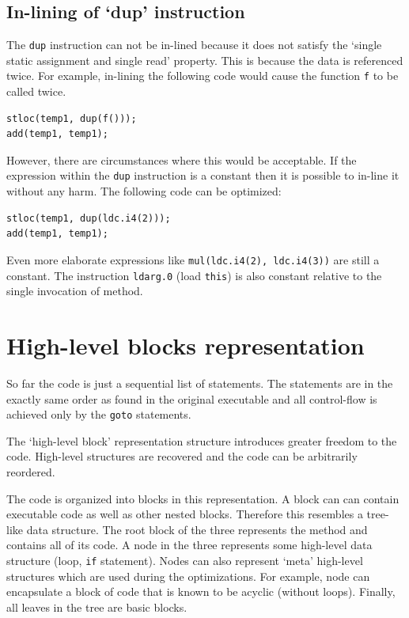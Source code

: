 \documentclass[12pt,twoside,notitlepage]{report}
\begin{document}
\subsection{In-lining of `dup' instruction}

The \verb|dup| instruction can not be in-lined because
it does not satisfy the `single static assignment and single read'
property.  This is because the data is referenced twice.
For example, in-lining the following code would cause 
the function \verb|f| to be called twice.
\begin{verbatim}
stloc(temp1, dup(f()));
add(temp1, temp1);
\end{verbatim}
However, there are circumstances where this would be acceptable.
If the expression within the \verb|dup| instruction is a 
constant then it is possible to in-line it without any harm.
The following code can be optimized:
\begin{verbatim}
stloc(temp1, dup(ldc.i4(2)));
add(temp1, temp1);
\end{verbatim}
Even more elaborate expressions like 
\verb|mul(ldc.i4(2), ldc.i4(3))| are still a constant.
The instruction \verb|ldarg.0| (load \verb|this|) is also
constant relative to the single invocation of method.



\section{High-level blocks representation}
  \label{High-level blocks representation}

So far the code is just a sequential list of statements.
The statements are in the exactly same order as found in the 
original executable and all control-flow is achieved 
only by the \verb|goto| statements.

The `high-level block' representation structure introduces
greater freedom to the code.  High-level structures are recovered 
and the code can be arbitrarily reordered.

The code is organized into blocks in this representation. 
A block can can contain executable code as well as other nested blocks.
Therefore this resembles a tree-like data structure.
The root block of the three represents the method and contains
all of its code.
A node in the three represents some high-level data structure
(loop, \verb|if| statement).  Nodes can also represent `meta'
high-level structures which are used during the optimizations.
For example, node can encapsulate a block of code that is known
to be acyclic (without loops).
Finally, all leaves in the tree are basic blocks.
\end{document}

